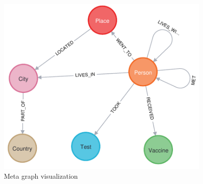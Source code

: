 \documentclass{article}[IEEEtran]
\begin{document}
\begin{figure}[H]
\begin{center}
    \includegraphics[width=0.95\textwidth]{meta_graph.pdf}
    \caption{Meta graph visualization}
\end{center}
\end{figure}








\end{document}
